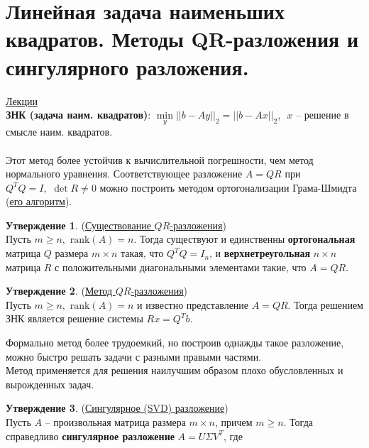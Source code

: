 \documentclass[specialist, subf, href, colorlinks=true, 12pt, times, mtpro, final]{disser}
\theoremstyle{definition}
\newtheorem{state}{Утверждение}[section]
\def\rk{\text{rank}}
\begin{document}
{\section {Линейная задача наименьших квадратов. Методы QR-разложения и сингулярного разложения.}
    \hyperlink {lects.72}{Лекции}\\
    {\bf ЗНК (задача наим. квадратов)}: $\min\limits_{y}||b - Ay||_2 = ||b - Ax||_2$,\,\, $x$ -- решение в смысле наим. квадратов.\\

    \\
    Этот метод более устойчив к вычислительной погрешности, чем метод нормального уравнения.
    Соответствующее разложение $A = QR$ при $Q^TQ = I, \,\, \det R \ne 0$ можно построить
    методом ортогонализации Грама-Шмидта (\hyperlink {lects.72}{его алгоритм}).
    \begin{state} (\hyperlink {lects.72}{Существование $QR$-разложения})\\
    Пусть $m \ge n, \,\, \rk(A) = n$. Тогда существуют и единственны {\bf ортогональная}
    матрица $Q$ размера $m\times n$ такая, что $Q^T Q = I_n$, и {\bf верхнетреугольная}
    $n\times n$ матрица $R$ с положительными диагональными элементами такие, что $A=QR$.
    \end{state}
    \begin{state} (\hyperlink {lects.72}{Метод $QR$-разложения})\\
    Пусть $m \ge n, \,\, \rk(A) = n$ и известно представление $A=QR$. Тогда решением ЗНК
    является решение системы $Rx = Q^T b$.
    \end{state}
    Формально метод более трудоемкий, но построив однажды такое разложение, можно быстро
    решать задачи с разными правыми частями.
    \\
    Метод применяется для решения наилучшим образом плохо обусловленных и вырожденных задач.
    \begin{state} (\hyperlink {lects.73}{Сингулярное (SVD) разложение})\\
    Пусть $A$ -- произвольная матрица размера $m\times n$, причем $m \ge n$. Тогда
    справедливо {\bf сингулярное разложение} $A = U\Sigma V^T$, где
\end{state}}
\end{document}
